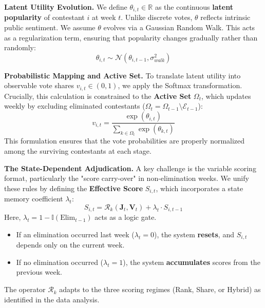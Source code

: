 \documentclass{mcmthesis}
\begin{document}
\noindent \textbf{Latent Utility Evolution.}
We define $\theta_{i,t} \in \mathbb{R}$ as the continuous \textbf{latent popularity} of contestant $i$ at week $t$. Unlike discrete votes, $\theta$ reflects intrinsic public sentiment. We assume $\theta$ evolves via a Gaussian Random Walk. This acts as a regularization term, ensuring that popularity changes gradually rather than randomly:
\begin{equation}
	\theta_{i,t} \sim \mathcal{N}(\theta_{i,t-1}, \sigma^2_{walk})
	\label{eq:random_walk}
\end{equation}

\noindent \textbf{Probabilistic Mapping and Active Set.}
To translate latent utility into observable vote shares $v_{i,t} \in (0,1)$, we apply the Softmax transformation. Crucially, this calculation is constrained to the \textbf{Active Set} $\Omega_t$, which updates weekly by excluding eliminated contestants ($\Omega_t = \Omega_{t-1} \setminus \mathcal{E}_{t-1}$):
\begin{equation}
	v_{i,t} = \frac{\exp(\theta_{i,t})}{\sum_{k \in \Omega_t} \exp(\theta_{k,t})}
	\label{eq:softmax}
\end{equation}
This formulation ensures that the vote probabilities are properly normalized among the surviving contestants at each stage.

\noindent \textbf{The State-Dependent Adjudication.}
A key challenge is the variable scoring format, particularly the "score carry-over" in non-elimination weeks. We unify these rules by defining the \textbf{Effective Score} $S_{i,t}$, which incorporates a state memory coefficient $\lambda_t$:
\begin{equation}
	S_{i,t} = \mathcal{R}_k(\mathbf{J}_t, \mathbf{V}_t) + \lambda_t \cdot S_{i,t-1}
	\label{eq:adjudication}
\end{equation}
Here, $\lambda_t = 1 - \mathbb{I}(\text{Elim}_{t-1})$ acts as a logic gate. 
\begin{itemize}[leftmargin=*, noitemsep, topsep=0pt]
	\item If an elimination occurred last week ($\lambda_t=0$), the system \textbf{resets}, and $S_{i,t}$ depends only on the current week.
	\item If no elimination occurred ($\lambda_t=1$), the system \textbf{accumulates} scores from the previous week.
\end{itemize}
The operator $\mathcal{R}_k$ adapts to the three scoring regimes (Rank, Share, or Hybrid) as identified in the data analysis.
\end{document}
